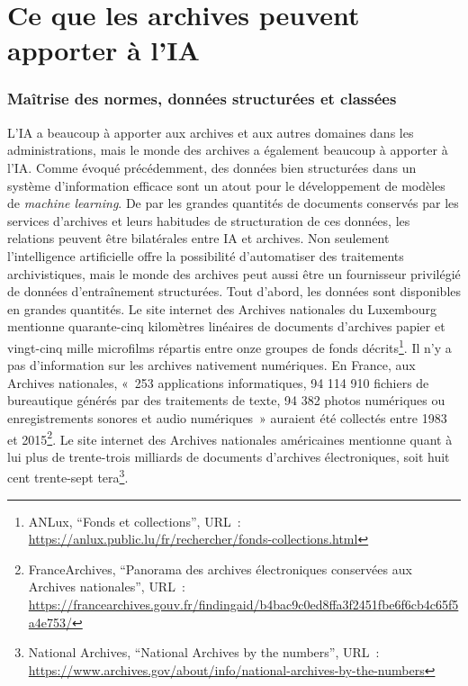 \chapter{Ce que les archives peuvent apporter à l'IA}

\subsection{Maîtrise des normes, données structurées et	classées}

	
	L'IA a beaucoup à apporter aux archives et aux autres domaines dans les
	administrations, mais le monde des archives a également beaucoup à
	apporter à l'IA. Comme évoqué précédemment, des données bien structurées
	dans un système d'information efficace sont un atout pour le
	développement de modèles de \emph{machine learning}. De par les grandes
	quantités de documents conservés par les services d'archives et leurs
	habitudes de structuration de ces données, les relations peuvent être
	bilatérales entre IA et archives. Non seulement l'intelligence
	artificielle offre la possibilité d'automatiser des traitements
	archivistiques, mais le monde des archives peut aussi être un fournisseur
	privilégié de données d'entraînement structurées. Tout d'abord, les
	données sont disponibles en grandes quantités. Le site internet des Archives
	nationales du Luxembourg mentionne quarante-cinq kilomètres linéaires de documents
	d'archives papier et vingt-cinq mille microfilms répartis entre onze groupes de
	fonds décrits\footnote{ANLux, \enquote{Fonds et collections},
		\textsc{URL}~: \url{https://anlux.public.lu/fr/rechercher/fonds-collections.html}}.
	Il n'y a pas d'information sur les archives nativement numériques. En
	France, aux Archives nationales, «~253 applications informatiques, 94
	114 910 fichiers de bureautique générés par des traitements de texte, 94
	382 photos numériques ou enregistrements sonores et audio numériques~»
	auraient été collectés entre 1983 et 2015\footnote{FranceArchives, \enquote{Panorama des archives électroniques conservées aux Archives nationales}, 
		\textsc{URL}~: \url{https://francearchives.gouv.fr/findingaid/b4bac9c0ed8ffa3f2451fbe6f6cb4c65f5a4e753/}}.
	Le site internet des Archives nationales américaines mentionne quant à
	lui plus de trente-trois milliards de documents d'archives électroniques, soit 
	huit cent trente-sept
	tera\footnote{National Archives, \enquote{National Archives by the numbers}, \textsc{URL}~: \url{https://www.archives.gov/about/info/national-archives-by-the-numbers}}.\newline
	
